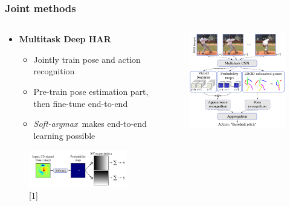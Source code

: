 \documentclass[9pt]{beamer}
\providecommand{\sourcefix}[1]{\\ \footnotesize \tugreen{Source:} [#1]}
\newenvironment{myframe}[1][]{%
\begin{frame}%
\frametitle{#1}
\setcounter{footnote}{0}


}{%
\end{frame}%
}
\begin{document}
\begin{myframe}[Joint methods]
	\begin{columns}[T]
	\begin{column}{.45\textwidth}
		\begin{itemize}
			\item \textbf{Multitask Deep HAR}\footnotemark
			\begin{itemize}
                \item Jointly train pose and action recognition
                \item Pre-train pose estimation part, then fine-tune end-to-end
				\item \textit{Soft-argmax}\footnotemark~makes end-to-end learning possible
			\end{itemize}
		\end{itemize}
        \begin{figure}
            \includegraphics[width=0.99\textwidth]{softargmax.png}
            \sourcefix{1}
        \end{figure}
	\end{column}
	\begin{column}{.45\textwidth}
		\begin{figure}
			\includegraphics[width=.99\textwidth]{endtoend-concept.png}

\end{figure}
\end{column}
\end{columns}
\end{myframe}
\end{document}
